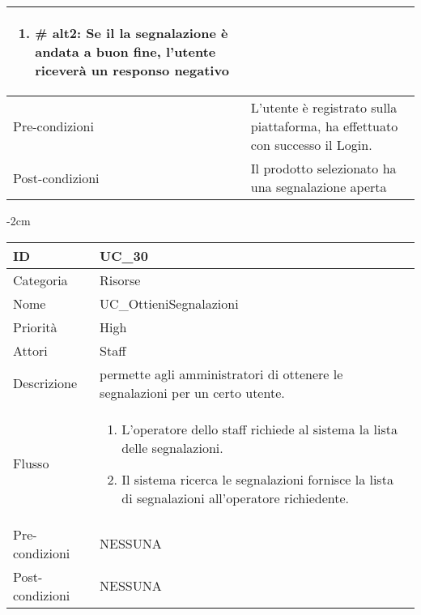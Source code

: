 \begin{center}
\begin{table}[bp]
\begin{tabular}{ |p{2.6cm}|p{13cm}|  }
\begin{enumerate}
\begin{enumerate}[label= ]
				\item \textbf{\# alt2}: Se il la segnalazione è andata a buon fine, l'utente riceverà un responso negativo
			\end{enumerate}
			\end{enumerate}
			\\\hline
Pre-condizioni & L'utente è registrato sulla piattaforma, ha effettuato con successo il Login.\\\hline
Post-condizioni & Il prodotto selezionato ha una segnalazione aperta\\\hline
\end{tabular}
\label{table_use_case:29}\newline
\end{table}

\begin{table}[bp]
    \centering
    \addtolength{\leftskip} {-2cm}
\begin{tabular}{ |p{2.6cm}|p{13cm}|  }
\hline
ID & UC\_30 \\\hline
Categoria & Risorse\\\hline
Nome & UC\_OttieniSegnalazioni\\\hline
Priorità & High \\\hline
Attori &  Staff \\\hline
Descrizione & permette agli amministratori di ottenere le segnalazioni per un certo utente.\\\hline
Flusso &  	\vspace{-5mm} \begin{enumerate}
			\item L'operatore dello staff richiede al sistema la lista delle segnalazioni.
			\item Il sistema ricerca le segnalazioni fornisce la lista di segnalazioni all'operatore richiedente.
			\end{enumerate}
			\\\hline
Pre-condizioni & NESSUNA\\\hline
Post-condizioni & NESSUNA\\\hline
\end{tabular}
\label{table_use_case:30}\newline
\end{table}


\end{center}
